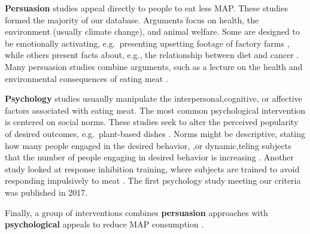 \documentclass[sn-nature,pdflatex]{sn-jnl}
\begin{document}
\begin{comment}
Do we put in something here about the line between choice architecture and nudge? I currently have it in the results section?
(See our results section forA handful of other studies [NAME THEM] identify their interventions as nudges, but do not alter the actual architecture of a choice, instead doing [WHAT THEY DO]. Our quantitative results are presented both with and without these studies included with the choice architecture studies.)
\end{comment}

\textbf{Persuasion} studies
\citep{kanchanachitra2020, abrahamse2007, acharya2004, banerjee2019, bianchi2022, bochmann2017, bschaden2020, carfora2023, hennessy2016, piester2020, cooney2014, cooney2016, feltz2022, haile2021, hatami2018, jalil2023, mathur2021effectiveness, merrill2009, norris2014, peacock2017, polanco2022, sparkman2021, weingarten2022}
appeal directly to people to eat less MAP. These studies formed the
majority of our database. Arguments focus on health, the environment
(usually climate change), and animal welfare. Some are designed to be
emotionally activating, e.g.~presenting upsetting footage of factory
farms \citep{polanco2022}, while others present facts about, e.g., the
relationship between diet and cancer \citep{hatami2018}. Many persuasion
studies combine arguments, such as a lecture on the health and
environmental consequences of eating meat \citep{jalil2023}.

\textbf{Psychology} studies
\citep{aldoh2023, allen2002, camp2019, coker2022, griesoph2021, piester2020, sparkman2017, sparkman2020}
usuaully manipulate the interpersonal,cognitive, or affective factors
associated with eating meat. The most common psychological intervention
is centered on social norms. These studies seek to alter the perceived
popularity of desired outcomes, e.g.~plant-based dishes
\citep{sparkman2017}. Norms might be descriptive, stating how many
people engaged in the desired behavior, \citep{aldoh2023},or
dynamic,teling subjects that the number of people engaging in desired
behavior is increasing
\citep{aldoh2023, coker2022, sparkman2017, sparkman2020}. Another study
looked at response inhibition training, where subjects are trained to
avoid responding impulsively to meat \citep{camp2019}. The first
psychology study meeting our criteria was published in 2017.

Finally, a group of interventions combines \textbf{persuasion}
approaches with \textbf{psychological} appeals to reduce MAP consumption
\citep{berndsen2005, bertolaso2015, carfora2023, fehrenbach2015, hennessy2016, mattson2020, piester2020, shreedhar2021}.
\end{document}
